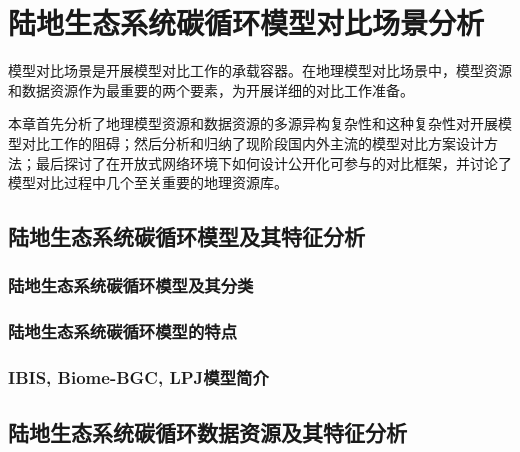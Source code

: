 \chapter{陆地生态系统碳循环模型对比场景分析}


模型对比场景是开展模型对比工作的承载容器。在地理模型对比场景中，模型资源和数据资源作为最重要的两个要素，为开展详细的对比工作准备。

本章首先分析了地理模型资源和数据资源的多源异构复杂性和这种复杂性对开展模型对比工作的阻碍；然后分析和归纳了现阶段国内外主流的模型对比方案设计方法；最后探讨了在开放式网络环境下如何设计公开化可参与的对比框架，并讨论了模型对比过程中几个至关重要的地理资源库。

\section{陆地生态系统碳循环模型及其特征分析}
\subsection{陆地生态系统碳循环模型及其分类}
\subsection{陆地生态系统碳循环模型的特点}
\subsection{IBIS, Biome-BGC, LPJ模型简介}
\section{陆地生态系统碳循环数据资源及其特征分析}
